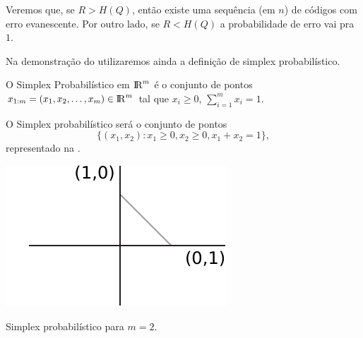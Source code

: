 Veremos que, se $R > H(Q)$, então existe uma sequência (em $n$) de códigos com erro evanescente.
Por outro lado, se $R < H(Q)$ a probabilidade de erro vai pra $1$.

Na demonstração do  utilizaremos ainda a definição de simplex probabilístico.
\begin{definition}
  O Simplex Probabilístico em ${\rm I\!R}^m$ é o conjunto de pontos
  $x_{1:m} = (x_1, x_2, \ldots, x_m) \in {\rm I\!R}^m$ tal que $x_i \geq 0$, $\sum_{i=1}^{m} x_i = 1$.
\end{definition}

\begin{example}[Simplex Probabilístico com $m=2$]
  O Simplex probabilístico será o conjunto de pontos
  \begin{equation}
  \{ (x_1, x_2)  :  x_1 \geq 0 , x_2 \geq 0 , x_1 + x_2 = 1 \} ,
  \end{equation}
  representado na .
    \begin{marginfigure}
    \centering
    \includegraphics[width=\textwidth]{figures/prob-simplex-2.pdf}
    \caption{Simplex probabilístico para $m=2$.}
    \label{fig:prob-simplex-2}
    \end{marginfigure}
\end{example}

